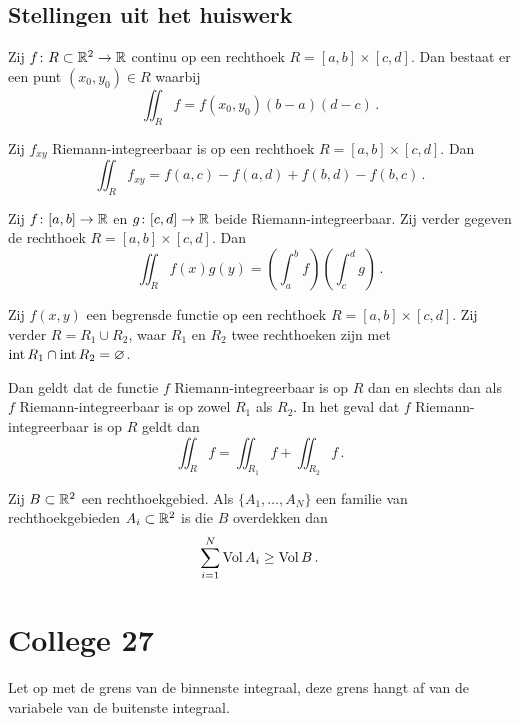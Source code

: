 \documentclass{2wa40summary}
\begin{document}
		\subsection{Stellingen uit het huiswerk}
		\begin{theorem}[\text{[K]} 11.1.10]
			Zij $f\colon R \subset \mathbb{R}^2 \to \mathbb{R}$ continu op een rechthoek $R = [a, b] \times [c, d]$.
			Dan bestaat er een punt $(x_0, y_0) \in R$ waarbij
			\[
			\iint_R f = f(x_0, y_0) (b - a) (d - c)\,.
			\]
		\end{theorem}
		\begin{theorem}[\text{[K] 11.2.6a}]
			Zij $f_{xy}$ Riemann-integreerbaar is op een rechthoek $R = [a, b] \times [c, d]$. Dan
			\[ 
				\iint_R f_{xy} = f(a, c) - f(a, d) + f(b, d) - f(b, c)\,.
			 \]
		\end{theorem}
		\begin{theorem}[\text{[K] 11.2.7a}]
			Zij $f\colon [a, b] \to \mathbb{R}$ en $g\colon [c, d] \to \mathbb{R}$ beide Riemann-integreerbaar. Zij verder gegeven de rechthoek $R = [a, b] \times [c, d]$. Dan
			\[ 
				\iint_R f(x) g(y) = \left( \int_a^b f \right) \left( \int_c^d g \right)\,.
			 \]
		\end{theorem}
		\begin{theorem}
			Zij $f(x, y)$ een begrensde functie op een rechthoek $R = [a, b] \times [c, d]$. Zij verder $R = R_1 \cup R_2$, waar $R_1$ en $R_2$ twee rechthoeken zijn met $\operatorname{\mathop{int}} R_1 \cap \operatorname{\mathop{int}} R_2 = \varnothing$.
			
			Dan geldt dat de functie $f$ Riemann-integreerbaar is op $R$ dan en slechts dan als $f$ Riemann-integreerbaar is op zowel $R_1$ als $R_2$. In het geval dat $f$ Riemann-integreerbaar is op $R$ geldt dan
			\[
			\iint_R f = \iint_{R_1} f + \iint_{R_2} f \,.
			\]
		\end{theorem}
		\begin{theorem}
			Zij $B \subset \mathbb{R}^2$ een rechthoekgebied. Als $\{ A_1, \dots, A_N \}$ een familie van rechthoekgebieden $A_i \subset \mathbb{R}^2$ is die $B$ overdekken dan
			\[
			\sum_{i=1}^N \operatorname{Vol} A_i \ge \operatorname{Vol} B \,.
			\]
		\end{theorem}
			
	\newpage
	\section{College 27}
		\begin{valkuil}
			Let op met de grens van de binnenste integraal, deze grens hangt af van de variabele van de buitenste integraal.
		\end{valkuil}
		
\end{document}
